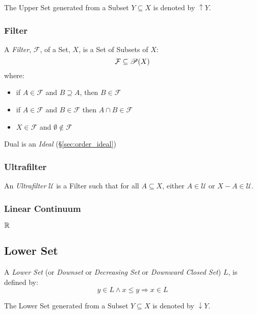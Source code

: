The Upper Set generated from a Subset $Y \subseteq X$ is denoted by
$\uparrow Y$.



\subsubsection{Filter}\label{sec:filter}

A \emph{Filter}, $\mathcal{F}$, of a Set, $X$, is a Set of Subsets of
$X$:
\[
  \mathcal{F} \subseteq \mathscr{P}(X)
\]
where:
\begin{itemize}
\item if $A \in \mathcal{F}$ and $B \supseteq A$, then $B \in
  \mathcal{F}$
\item if $A \in \mathcal{F}$ and $B \in \mathcal{F}$ then $A \cap B
  \in \mathcal{F}$
\item $X \in \mathcal{F}$ and $\emptyset \notin \mathcal{F}$
\end{itemize}

Dual is an \emph{Ideal} (\S\ref{sec:order_ideal})



\subsubsection{Ultrafilter}\label{sec:ultrafilter}

An \emph{Ultrafilter} $\mathcal{U}$ is a Filter such that for all $A
\subseteq X$, either $A \in \mathcal{U}$ or $X - A \in \mathcal{U}$.



\subsubsection{Linear Continuum}\label{sec:linear_continuum}

$\mathbb{R}$



\subsection{Lower Set}\label{sec:lower_set}

A \emph{Lower Set} (or \emph{Downset} or \emph{Decreasing Set} or
\emph{Downward Closed Set}) $L$, is defined by:
\[
  y \in L \wedge x \leq y \Rightarrow x \in L
\]

The Lower Set generated from a Subset $Y \subseteq X$ is denoted by
$\downarrow Y$.



